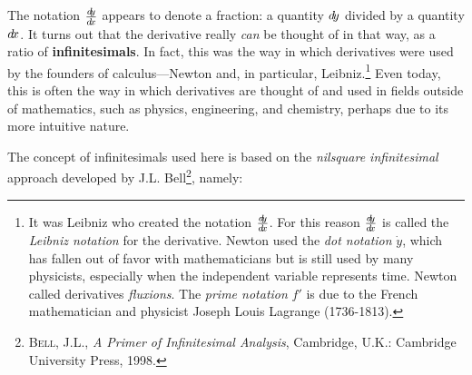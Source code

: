 
The notation $\frac{d\negmedspace y}{d\!x}$ appears to denote a fraction: a quantity $d\!y$
divided by a quantity $d\!x$. It turns out that the derivative really \emph{can}
be thought of in that way, as a ratio of \textbf{infinitesimals}. In fact,
this was the way in which derivatives were used by the founders
of calculus---Newton and, in particular, Leibniz.\footnote{It was
Leibniz who created the notation $\frac{d\negmedspace y}{d\!x}$. For this reason $\frac{d\negmedspace y}{d\!x}$ is called
the \emph{Leibniz notation} for the derivative. Newton
used the \emph{dot notation} $\dot{y}$, which has fallen out of favor with
mathematicians but is still used by many physicists, especially when the
independent variable represents time. Newton called derivatives \emph{fluxions}.
The \emph{prime notation} $f'$ is due to the French mathematician and physicist
Joseph Louis Lagrange (1736-1813).} Even today, this is
often the way in which derivatives are thought of and used in fields outside of
mathematics, such as physics, engineering, and chemistry, perhaps due to its
more intuitive nature.

The concept of infinitesimals used here
is based on the \emph{nilsquare infinitesimal} approach developed by J.L.
Bell\footnote{\textsc{Bell, J.L.}, \emph{A Primer of Infinitesimal Analysis}, 
Cambridge, U.K.: Cambridge University Press, 1998.}, namely:



